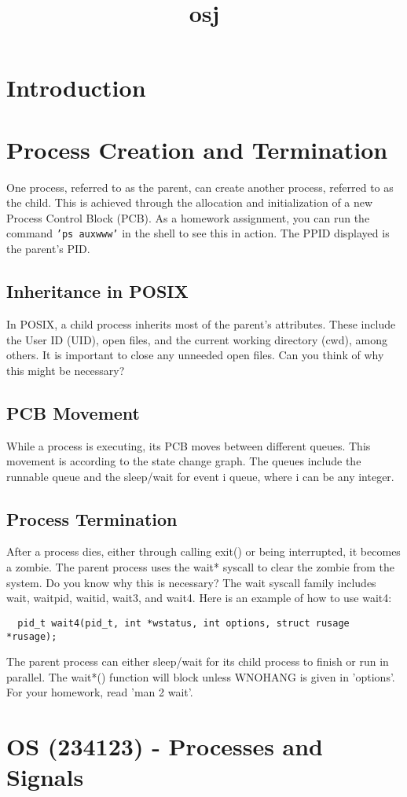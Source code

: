 \documentclass[12pt]{report}
\title{osj}
\author{}
\begin{document}
\maketitle
\tableofcontents
\newpage

\section{Introduction}
  \section{Process Creation and Termination}    One process, referred to as the parent, can create another process, referred to as the child. This is achieved through the allocation and initialization of a new Process Control Block (PCB). As a homework assignment, you can run the command \texttt{'ps auxwww'} in the shell to see this in action. The PPID displayed is the parent's PID.    \subsection{Inheritance in POSIX}    In POSIX, a child process inherits most of the parent's attributes. These include the User ID (UID), open files, and the current working directory (cwd), among others. It is important to close any unneeded open files. Can you think of why this might be necessary?    \subsection{PCB Movement}    While a process is executing, its PCB moves between different queues. This movement is according to the state change graph. The queues include the runnable queue and the sleep/wait for event i queue, where i can be any integer.    \subsection{Process Termination}    After a process dies, either through calling exit() or being interrupted, it becomes a zombie. The parent process uses the wait* syscall to clear the zombie from the system. Do you know why this is necessary? The wait syscall family includes wait, waitpid, waitid, wait3, and wait4. Here is an example of how to use wait4:    \begin{lstlisting}  pid_t wait4(pid_t, int *wstatus, int options, struct rusage *rusage);  \end{lstlisting}    The parent process can either sleep/wait for its child process to finish or run in parallel. The wait*() function will block unless WNOHANG is given in 'options'. For your homework, read 'man 2 wait'.    \section{OS (234123) - Processes and Signals}  
\end{document}
